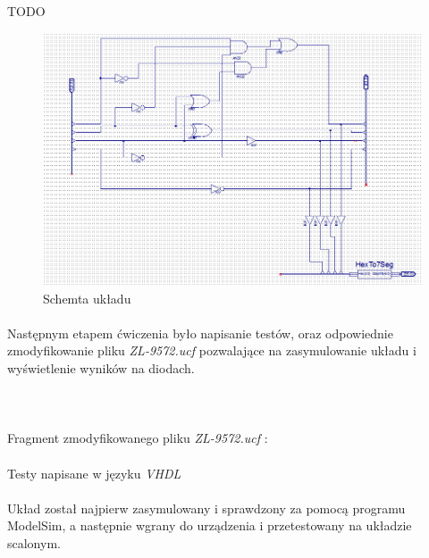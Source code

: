\documentclass[wide,a4paper,titlepage,12pt] {article}
\begin{document}
TODO
	\begin{figure}[htbp]
	 		\begin{center}
         \includegraphics[scale=0.7]{pic2.PNG}
      \caption{Schemta układu}
     \end{center}
  \end{figure}

  \paragraph{}
  Następnym etapem ćwiczenia było napisanie testów, oraz odpowiednie zmodyfikowanie pliku \textit{ZL-9572.ucf} pozwalające na zasymulowanie układu i wyświetlenie wyników na diodach.
	\\ \\ \\
	\paragraph{}
	Fragment zmodyfikowanego pliku \textit{ZL-9572.ucf} :
	

	\paragraph{}
	Testy napisane w języku \textit{VHDL}
	

	\paragraph{}
	Układ został najpierw zasymulowany i sprawdzony za pomocą programu ModelSim, a następnie wgrany do urządzenia i przetestowany na układzie scalonym.
\end{document}
